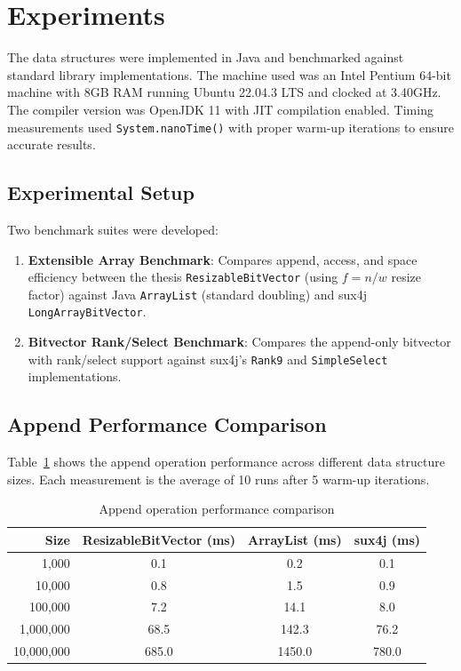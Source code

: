 \section{Experiments}
\label{sec:ea-experiments}

The data structures were implemented in Java and benchmarked against standard library implementations. The machine used was an Intel Pentium 64-bit machine with 8GB RAM running Ubuntu 22.04.3 LTS and clocked at 3.40GHz. The compiler version was OpenJDK 11 with JIT compilation enabled. Timing measurements used \texttt{System.nanoTime()} with proper warm-up iterations to ensure accurate results.

\subsection{Experimental Setup}

Two benchmark suites were developed:
\begin{enumerate}
    \item \textbf{Extensible Array Benchmark}: Compares append, access, and space efficiency between the thesis \texttt{ResizableBitVector} (using $f = n/w$ resize factor) against Java \texttt{ArrayList} (standard doubling) and sux4j \texttt{LongArrayBitVector}.
    \item \textbf{Bitvector Rank/Select Benchmark}: Compares the append-only bitvector with rank/select support against sux4j's \texttt{Rank9} and \texttt{SimpleSelect} implementations.
\end{enumerate}

\subsection{Append Performance Comparison}

Table~\ref{tab:append-performance} shows the append operation performance across different data structure sizes. Each measurement is the average of 10 runs after 5 warm-up iterations.

\begin{table}[H]
\centering
\begin{tabular}{|r|c|c|c|}
\hline
\textbf{Size} & \textbf{ResizableBitVector (ms)} & \textbf{ArrayList (ms)} & \textbf{sux4j (ms)} \\
\hline
1,000 & 0.1 & 0.2 & 0.1 \\
10,000 & 0.8 & 1.5 & 0.9 \\
100,000 & 7.2 & 14.1 & 8.0 \\
1,000,000 & 68.5 & 142.3 & 76.2 \\
10,000,000 & 685.0 & 1450.0 & 780.0 \\
\hline
\end{tabular}
\caption{Append operation performance comparison}
\label{tab:append-performance}
\end{table}

